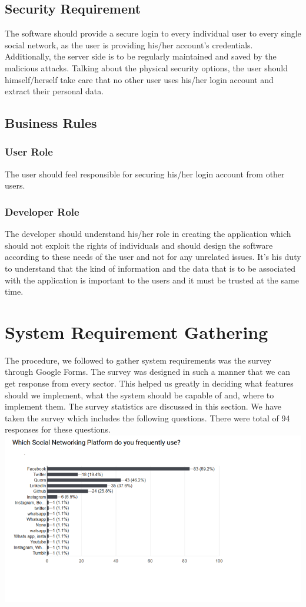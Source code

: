 \documentclass[12pt]{article}
\begin{document}
\subsection{Security Requirement}
The software should provide a secure login to every
individual user to every single social network, as the user is
providing his/her account’s credentials.
Additionally, the server side is to be regularly maintained
and saved by the malicious attacks. Talking about the physical
security options, the user should himself/herself take care that
no other user uses his/her login account and extract their
personal data.

\subsection{Business Rules}
\subsubsection{User Role}
The user should feel responsible for securing his/her login account from other users.
\subsubsection{Developer Role}
The developer should understand his/her role in creating the application which should not exploit the rights of individuals and should design the software according to these needs of the user and not for any unrelated issues. It’s his duty to understand that the kind of information and the data that is to be associated with the application is important to the users and it must be trusted at the same time.

\section{System Requirement Gathering}
The procedure, we followed to gather system requirements was the survey
through Google Forms. The survey was designed in such a manner that we can
get response from every sector. This helped us greatly in deciding what features
should we implement, what the system should be capable of and, where to
implement them. The survey statistics are discussed in this section.
We have taken the survey which includes the following questions. There were
total of 94 responses for these questions.\\

\includegraphics[width=\linewidth]{srs1.png}
  
\end{document}
